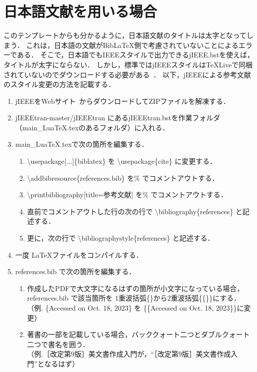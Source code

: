 \chapter{日本語文献を用いる場合}
このテンプレートからも分かるように，日本語文献のタイトルは太字となってしまう．
これは，日本語の文献がBibLaTeX側で考慮されていないことによるエラーである．
そこで，日本語でもIEEEスタイルで出力できるjIEEE.bstを使えば，タイトルが太字にならない．
しかし，標準ではjIEEEスタイルは\TeX Liveで同梱されていないのでダウンロードする必要がある~\cite{jieeetran}．
以下，jIEEEによる参考文献のスタイル変更の方法を記載する．

\begin{enumerate}
    \item jIEEEをWebサイト~\cite{jieeetran}からダウンロードしてZIPファイルを解凍する．
    \item jIEEEtran-master/jIEEEtran にあるjIEEEtran.bstを作業フォルダ（main\_LuaTeX.texのあるフォルダ）に入れる．
    \item main\_LuaTeX.texで次の箇所を編集する．
        \begin{enumerate}
            \item \textbackslash usepackage[...]\{biblatex\} を \textbackslash usepackage\{cite\} に変更する．
            \item \textbackslash addbibresource\{references.bib\} を\% でコメントアウトする．
            \item \textbackslash printbibliography[title={参考文献}] を\% でコメントアウトする．
            \item 直前でコメントアウトした行の次の行で \textbackslash bibliography\{references\} と記述する．
            \item 更に，次の行で \textbackslash bibliographystyle\{references\} と記述する．
        \end{enumerate}
    \item 一度 \LaTeX ファイルをコンパイルする．
    \item references.bib で次の箇所を編集する．
        \begin{enumerate}
            \item 作成したPDFで大文字になるはずの箇所が小文字になっている場合，references.bib で該当箇所を
                $1$重波括弧\{\}から$2$重波括弧\{\{\}\}にする．\\
                （例. \{Accessed on Oct. 18, 2023\} を \{\{Accessed on Oct. 18, 2023\}\}に変更）
            \item 著書の一部を記載している場合，バッククォート二つとダブルクォート二つで書名を囲う．\\
                （例.［改定第$9$版］\LaTeXe 美文書作成入門が，``［改定第$9$版］\LaTeXe 美文書作成入門''となるはず）
        \end{enumerate}
\end{enumerate}